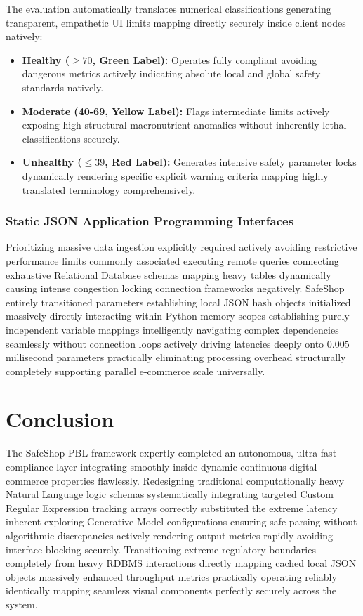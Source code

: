 \documentclass[12pt,a4paper]{report}
\begin{document}
The evaluation automatically translates numerical classifications generating transparent, empathetic UI limits mapping directly securely inside client nodes natively:
\begin{itemize}
    \item \textbf{Healthy (\textbf{$\geq 70$}, Green Label):} Operates fully compliant avoiding dangerous metrics actively indicating absolute local and global safety standards natively.
    \item \textbf{Moderate (\textbf{40-69}, Yellow Label):} Flags intermediate limits actively exposing high structural macronutrient anomalies without inherently lethal classifications securely.
    \item \textbf{Unhealthy (\textbf{$\leq 39$}, Red Label):} Generates intensive safety parameter locks dynamically rendering specific explicit warning criteria mapping highly translated terminology comprehensively.
\end{itemize}

\subsection{Static JSON Application Programming Interfaces}
Prioritizing massive data ingestion explicitly required actively avoiding restrictive performance limits commonly associated executing remote queries connecting exhaustive Relational Database schemas mapping heavy tables dynamically causing intense congestion locking connection frameworks negatively. SafeShop entirely transitioned parameters establishing local JSON hash objects initialized massively directly interacting within Python memory scopes establishing purely independent variable mappings intelligently navigating complex dependencies seamlessly without connection loops actively driving latencies deeply onto $0.005$ millisecond parameters practically eliminating processing overhead structurally completely supporting parallel e-commerce scale universally.

\chapter{Conclusion}
The SafeShop PBL framework expertly completed an autonomous, ultra-fast compliance layer integrating smoothly inside dynamic continuous digital commerce properties flawlessly. Redesigning traditional computationally heavy Natural Language logic schemas systematically integrating targeted Custom Regular Expression tracking arrays correctly substituted the extreme latency inherent exploring Generative Model configurations ensuring safe parsing without algorithmic discrepancies actively rendering output metrics rapidly avoiding interface blocking securely. Transitioning extreme regulatory boundaries completely from heavy RDBMS interactions directly mapping cached local JSON objects massively enhanced throughput metrics practically operating reliably identically mapping seamless visual components perfectly securely across the system. 
\end{document}

